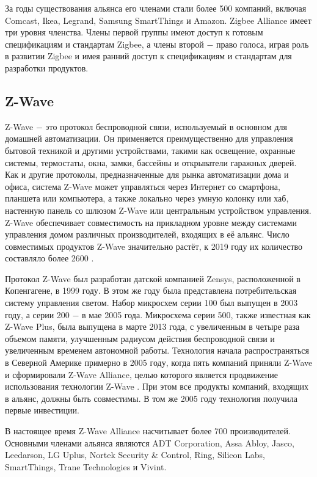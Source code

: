 	За годы существования альянса его членами стали более 500 компаний, включая Comcast, Ikea, Legrand, 
	Samsung SmartThings и Amazon. Zigbee Alliance имеет три уровня членства. Члены первой группы 
	имеют доступ к готовым спецификациям и стандартам Zigbee, а члены второй $-$ право голоса, 
	играя роль в развитии Zigbee и имея ранний доступ к спецификациям и стандартам для разработки 
	продуктов.
	
	
	\subsection{Z-Wave}
	Z-Wave $-$ это протокол беспроводной связи, используемый в основном для домашней автоматизации. 
	Он применяется преимущественно для управления бытовой техникой и другими устройствами, такими 
	как освещение, охранные системы, термостаты, окна, замки, бассейны и открыватели гаражных дверей.
	Как и другие протоколы, предназначенные для рынка автоматизации дома и офиса, система Z-Wave может 
	управляться через Интернет со смартфона, планшета или компьютера, а также локально через умную 
	колонку или хаб, настенную панель со шлюзом Z-Wave или центральным устройством управления. 
	Z-Wave обеспечивает совместимость на прикладном уровне между системами управления домом различных 
	производителей, входящих в её альянс. Число совместимых продуктов Z-Wave значительно растёт, 
	к 2019 году их количество составляло более 2600 \cite{z-wave-certified-products}.
	
	Протокол Z-Wave был разработан датской компанией Zensys, расположенной в Копенгагене, 
	в 1999 году. В этом же году была представлена потребительская 
	систему управления светом. Набор микросхем серии 100 был выпущен в 2003 году, а серии 200 $-$ 
	в мае 2005 года. Микросхема серии 500, также известная как Z-Wave Plus, была выпущена в марте 2013 года,
	с увеличенным в четыре раза объемом памяти, улучшенным радиусом действия беспроводной связи и 
	увеличенным временем автономной работы. Технология начала распространяться в Северной Америке 
	примерно в 2005 году, когда пять компаний приняли Z-Wave и сформировали Z-Wave Alliance, целью 
	которого является продвижение использования технологии Z-Wave \cite{z-wave-alliance}. При этом 
	все продукты компаний, входящих в альянс, должны быть совместимы. В том же 2005 году технология
	получила первые инвестиции.
	
	В настоящее время Z-Wave Alliance насчитывает более 700 производителей. Основными членами альянса 
	являются ADT Corporation, Assa Abloy, Jasco, Leedarson, LG Uplus, Nortek Security \& Control, Ring, Silicon Labs, 
	SmartThings, Trane Technologies и Vivint.
	
